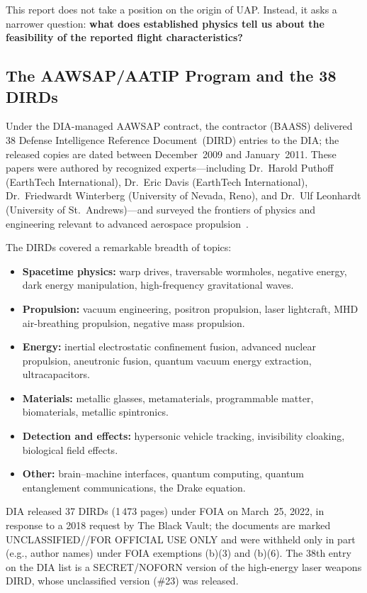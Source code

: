 \documentclass[aps,prd,twocolumn,superscriptaddress,nofootinbib,floatfix]{revtex4-2}
\begin{document}
This report does not take a position on the origin of UAP. Instead, it asks a
narrower question: \textbf{what does established physics tell us about the
feasibility of the reported flight characteristics?}

\subsection{The AAWSAP/AATIP Program and the 38 DIRDs}\label{sec:dirds}

Under the DIA-managed AAWSAP contract, the contractor (BAASS) delivered 38 Defense
Intelligence Reference Document~(DIRD) entries to the DIA; the released copies are
dated between December~2009 and January~2011. These papers were authored by
recognized experts---including Dr.~Harold Puthoff (EarthTech International),
Dr.~Eric Davis (EarthTech International), Dr.~Friedwardt Winterberg (University of
Nevada, Reno), and Dr.~Ulf Leonhardt (University of St.~Andrews)---and surveyed
the frontiers of physics and engineering relevant to advanced aerospace
propulsion~\cite{AARO2024,DIRD_ObousyDavis,DIRD_Puthoff,DIRD_Davis_Wormholes,DIRD_Winterberg,DIRD_Leonhardt,DIRD_Davis_Antigravity}.

The DIRDs covered a remarkable breadth of topics:
\begin{itemize}
  \item \textbf{Spacetime physics:} warp drives, traversable wormholes, negative
        energy, dark energy manipulation, high-frequency gravitational waves.
  \item \textbf{Propulsion:} vacuum engineering, positron propulsion, laser
        lightcraft, MHD air-breathing propulsion, negative mass propulsion.
  \item \textbf{Energy:} inertial electrostatic confinement fusion, advanced
        nuclear propulsion, aneutronic fusion, quantum vacuum energy extraction,
        ultracapacitors.
  \item \textbf{Materials:} metallic glasses, metamaterials, programmable matter,
        biomaterials, metallic spintronics.
  \item \textbf{Detection and effects:} hypersonic vehicle tracking, invisibility
        cloaking, biological field effects.
  \item \textbf{Other:} brain--machine interfaces, quantum computing, quantum
        entanglement communications, the Drake equation.
\end{itemize}

DIA released 37 DIRDs (1\,473 pages) under FOIA on March~25, 2022, in response to
a 2018 request by The Black Vault; the documents are marked UNCLASSIFIED//FOR
OFFICIAL USE ONLY and were withheld only in part (e.g., author names) under FOIA
exemptions (b)(3) and (b)(6). The 38th entry on the DIA list is a SECRET/NOFORN
version of the high-energy laser weapons DIRD, whose unclassified version (\#23)
was released.
\end{document}

